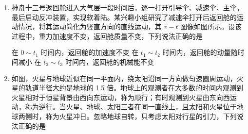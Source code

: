 \documentclass[\gkver]{gaokaozhenti}
\begin{document}
\begin{enumerate}
{$U = IR_{2}$

可知 $U$ 不断变小，根据原副线圈的功率相等可知 $R_{1}$ 消耗的功率

$P_{1} = IU_{1} = \frac{U_{0}}{n^{2}R_{1} + R_{2}}\cdot(U_{0} - \frac{U_{0}R_{2}}{n^{2}R_{1} + R_{2}})$

整理可得

$P_{1} = \frac{U_{0}^{2}}{n^{2}R_{1} + \frac{R_{2}^{2}}{n^{2}R_{1}} + 2R_{2}}$

可知 $n = 3$ 时，$R_{1}$ 消耗的功率有最大值，可知 $R_{1}$ 消耗的功率先增大，后减小，故 CD 错误。

故选 B。
}

\item
神舟十三号返回舱进入大气层一段时间后，逐一打开引导伞、减速伞、主伞，最后启动反冲装置，实现软着陆。某兴趣小组研究了减速伞打开后返回舱的运动情况，将其运动简化为竖直方向的直线运动，其 $v-t$ 图像如图所示。设该过程中，重力加速度不变，返回舱质量不变，下列说法正确的是


{在 $0\sim t_{1}$ 时间内，返回舱的加速度不变}
{在 $t_{1}\sim t_{2}$ 时间内，返回舱的动量随时间减小}
{在 $t_{2}\sim t_{3}$ 时间内，返回舱的机械能不变}


\item
如图，火星与地球近似在同一平面内，绕太阳沿同一方向做匀速圆周运动，火星的轨道半径大约是地球的 1.5 倍。地球上的观测者在大多数的时间内观测到火星相对于恒星背景由西向东运动，称为顺行；有时观测到火星由东向西运动，称为逆行。当火星、地球、太阳三者在同一直线上，且太阳和火星位于地球两侧时，称为火星冲日。忽略地球自转，只考虑太阳对行星的引力，下列说法正确的是


\end{enumerate}
\end{document}
